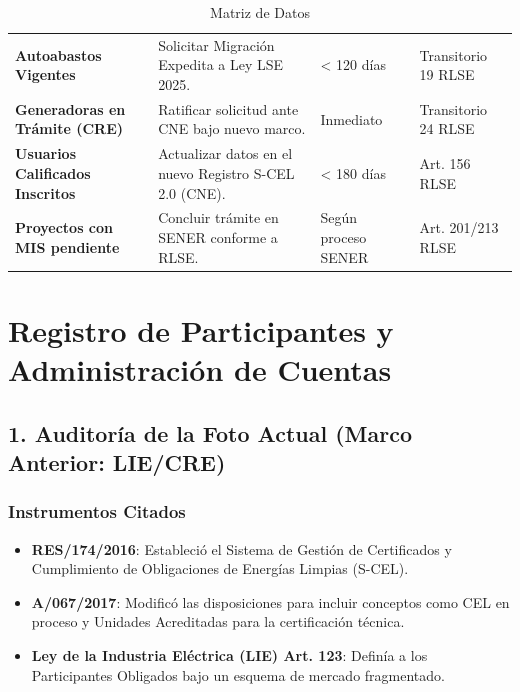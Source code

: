 \documentclass{cel}
\begin{document}
\vspace{0.3cm}
\begin{tabladoradoLargo}
\renewcommand{\tabularxcolumn}[1]{p{#1}}
\begin{xltabular}{\textwidth}{|X|X|X|X|}
\caption{Matriz de Datos} \\
\toprule
{}  &  &  &  \\
\midrule
\endhead
\textbf{Autoabastos Vigentes} & Solicitar Migración Expedita a Ley LSE 2025. & \textless{} 120 días & Transitorio 19 RLSE \\ \hline
\textbf{Generadoras en Trámite (CRE)} & Ratificar solicitud ante CNE bajo nuevo marco. & Inmediato & Transitorio 24 RLSE \\ \hline
\textbf{Usuarios Calificados Inscritos} & Actualizar datos en el nuevo Registro S-CEL 2.0 (CNE). & \textless{} 180 días & Art. 156 RLSE \\ \hline
\textbf{Proyectos con MIS pendiente} & Concluir trámite en SENER conforme a RLSE. & Según proceso SENER & Art. 201/213 RLSE \\ \hline
\bottomrule
\end{xltabular}
\end{tabladoradoLargo}

{}
\section*{Registro de Participantes y Administración de Cuentas}
\nopagebreak

\subsection{1. Auditoría de la \textquotedbl{}Foto Actual\textquotedbl{} (Marco Anterior: LIE/CRE)}
\nopagebreak

\subsubsection{Instrumentos Citados}
\nopagebreak

\begin{itemize}
\item \textbf{RES/174/2016}: Estableció el Sistema de Gestión de Certificados y Cumplimiento de Obligaciones de Energías Limpias (S-CEL).
\item \textbf{A/067/2017}: Modificó las disposiciones para incluir conceptos como \textquotedbl{}CEL en proceso\textquotedbl{} y \textquotedbl{}Unidades Acreditadas\textquotedbl{} para la certificación técnica.
\item \textbf{Ley de la Industria Eléctrica (LIE) Art. 123}: Definía a los \textquotedbl{}Participantes Obligados\textquotedbl{} bajo un esquema de mercado fragmentado.

\end{itemize}
\end{document}
